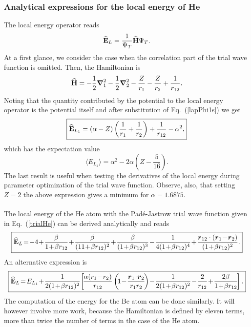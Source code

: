 \subsubsection*{Analytical expressions for the local energy of He}
The local energy operator reads 
$${\bf\widehat{E}}_L = \frac{1}{\Psi_T}{\bf\widehat{H}} \Psi_T.$$
At a first glance, we consider the case when the correlation part of the trial wave function is omitted. Then, the Hamiltonian is
\begin{equation}\label{HeHaNoCor}
 {\bf\widehat{H}} = -\frac{1}{2}\boldsymbol{\nabla}_{1}^{2} -\frac{1}{2}\boldsymbol{\nabla}_{2}^{2} - \frac{Z}{r_1} - \frac{Z}{r_2} + \frac{1}{r_{12}}.
\end{equation}
Noting that the quantity contributed by the potential to the local energy operator is the potential itself and after substitution of Eq.~(\ref{lapPhi1s}) we get 
\begin{equation}
 \boxed{{\bf\widehat{E}}_{L_1} = (\alpha - Z)\left(\frac{1}{r_1} + \frac{1}{r_2}\right) + \frac{1}{r_{12}} - \alpha^2,}
 \end{equation}
 which has the expectation value 
 \begin{equation}
  \boxed{\langle E_{L_1} \rangle = \alpha^2 - 2 \alpha \left(Z - \frac{5}{16} \right).}
 \end{equation}
The last result is useful when testing the derivatives of the local energy during parameter optimization of the trial wave function. Observe, also, that setting $Z=2$ the above expression gives a minimum for $\alpha = 1.6875$.\\
\\
\noindent
The local energy of the He atom with the Pad\'e-Jastrow trial wave function given in Eq.~(\ref{trialHe}) can be derived analytically and reads
\begin{equation}
 \boxed{\Op{E}_L \!=\! -4 \!+\! \frac{\beta}{1 \!+\! \beta r_{12}} \!+\! \frac{\beta}{(1 1\!+\! \beta r_{12})^2} \!+\! \frac{\beta}{(1 \!+\! \beta r_{12})^3} \!-\! \frac{1}{4(1 \!+\! \beta r_{12})^4} \!+\! \frac{\bfv{r}_{12}\cdot(\bfv{r}_1 \!-\! \bfv{r}_2)}{(1 \!+\! \beta r_{12})^2}.}
\end{equation}
An alternative expression is
\begin{equation}
 \boxed{\Op{E}_L \!= \!E_{L_1} \!+ \!\frac{1}{2(1\! +\!\beta r_{12})^2}\!\left[\!\frac{\alpha(r_1 \!- \!r_2)}{r_{12}} \left(\!1 \!-\! \frac{\bfv{r}_1\!\cdot \!\bfv{r}_2}{r_1 r_2}\!\right) \!-\! \frac{1}{2(1 \!+\!\beta r_{12})^2} \!-\! \frac{2}{r_{12}} \!+\! \frac{2\beta}{1 \!+\! \beta r_{12}}\!\right].}
\end{equation}
The computation of the energy for the Be atom can be done similarly. It will however involve more work, because the Hamiltonian is defined by eleven terms, more than twice the number of terms in the case of the He atom.

